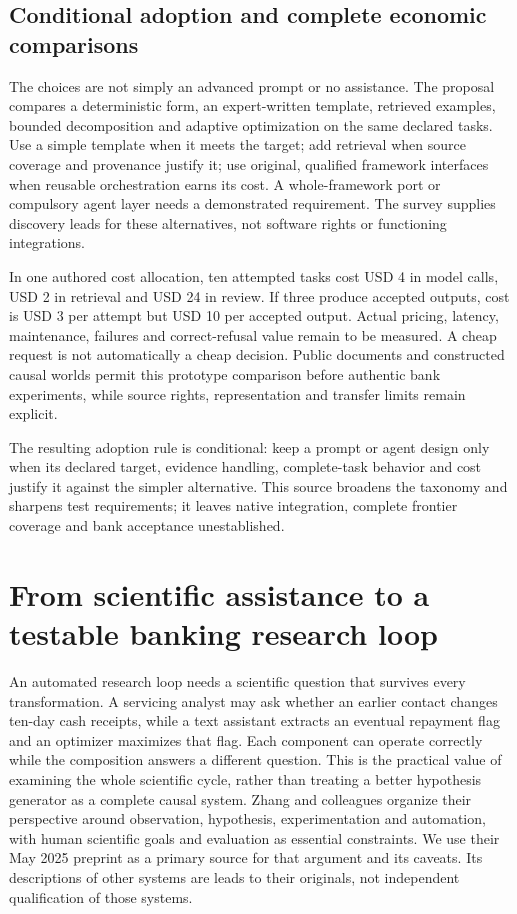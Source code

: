 \subsection{Conditional adoption and complete economic comparisons}

The choices are not simply an advanced prompt or no assistance. The proposal
compares a deterministic form, an expert-written template, retrieved examples,
bounded decomposition and adaptive optimization on the same declared tasks.
Use a simple template when it meets the target; add retrieval when source
coverage and provenance justify it; use original, qualified framework interfaces
when reusable orchestration earns its cost. A whole-framework port or compulsory
agent layer needs a demonstrated requirement. The survey supplies discovery
leads for these alternatives, not software rights or functioning integrations.

In one authored cost allocation, ten attempted tasks cost USD 4 in model calls,
USD 2 in retrieval and USD 24 in review. If three produce accepted outputs,
cost is USD 3 per attempt but USD 10 per accepted output. Actual pricing,
latency, maintenance, failures and correct-refusal value remain to be measured.
A cheap request is not automatically a cheap decision. Public documents and
constructed causal worlds permit this prototype comparison before authentic
bank experiments, while source rights, representation and transfer limits remain
explicit.~\citep{exec24_promptengineering_reference}

The resulting adoption rule is conditional: keep a prompt or agent design only
when its declared target, evidence handling, complete-task behavior and cost
justify it against the simpler alternative. This source broadens the taxonomy
and sharpens test requirements; it leaves native integration, complete frontier
coverage and bank acceptance unestablished.


\section{From scientific assistance to a testable banking research loop}
\label{sec:exec24-scientific-method}

An automated research loop needs a scientific question that survives every transformation.
A servicing analyst may ask whether an earlier contact changes ten-day cash receipts,
while a text assistant extracts an eventual repayment flag and an optimizer maximizes
that flag. Each component can operate correctly while the composition answers a
different question. This is the practical value of examining the whole scientific
cycle, rather than treating a better hypothesis generator as a complete causal system.
Zhang and colleagues organize their perspective around observation, hypothesis,
experimentation and automation, with human scientific goals and evaluation as essential
constraints. We use their May 2025 preprint as a primary source for that argument
and its caveats. Its descriptions of other systems are leads to their originals,
not independent qualification of those systems.~\citep{exec24_scimethod_original}

